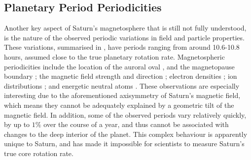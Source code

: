 {\subsection{Planetary Period Periodicities}\label{intro:sec:periodicities}
Another key aspect of Saturn's magnetosphere that is still not fully understood, is the nature of the observed periodic variations in field and particle properties. These variations, summarised in \citet{carbary2013}, have periods ranging from around 10.6-10.8 hours, assumed close to the true planetary rotation rate. Magnetospheric periodicities include the location of the auroral oval \citep{provan2009b}, and the magnetopause boundary \citep{clarke2010}; the magnetic field strength and direction \citep{espinosa2000, andrews2008}; electron densities \citep{morooka2009}; ion distributions \citep{burch2009}; and energetic neutral atoms \citep{paranicas2005}. These observations are especially interesting due to the aforementioned axisymmetry of Saturn's magnetic field, which means they cannot be adequately explained by a geometric tilt of the magnetic field. In addition, some of the observed periods vary relatively quickly, by up to $1\%$ over the course of a year, and thus cannot be associated with changes to the deep interior of the planet. This complex behaviour is  apparently unique to Saturn, and has made it impossible for scientists to measure Saturn's true core rotation rate.

}
